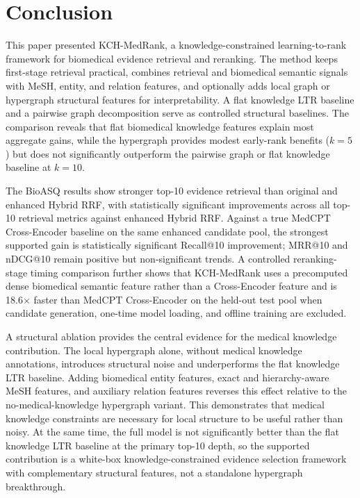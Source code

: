 \section{Conclusion}

This paper presented KCH-MedRank, a knowledge-constrained learning-to-rank framework for biomedical evidence retrieval and reranking. The method keeps first-stage retrieval practical, combines retrieval and biomedical semantic signals with MeSH, entity, and relation features, and optionally adds local graph or hypergraph structural features for interpretability. A flat knowledge LTR baseline and a pairwise graph decomposition serve as controlled structural baselines. The comparison reveals that flat biomedical knowledge features explain most aggregate gains, while the hypergraph provides modest early-rank benefits ($k{=}5$) but does not significantly outperform the pairwise graph or flat knowledge baseline at $k{=}10$.

The BioASQ results show stronger top-10 evidence retrieval than original and enhanced Hybrid RRF, with statistically significant improvements across all top-10 retrieval metrics against enhanced Hybrid RRF. Against a true MedCPT Cross-Encoder baseline on the same enhanced candidate pool, the strongest supported gain is statistically significant Recall@10 improvement; MRR@10 and nDCG@10 remain positive but non-significant trends. A controlled reranking-stage timing comparison further shows that KCH-MedRank uses a precomputed dense biomedical semantic feature rather than a Cross-Encoder feature and is 18.6$\times$ faster than MedCPT Cross-Encoder on the held-out test pool when candidate generation, one-time model loading, and offline training are excluded.

A structural ablation provides the central evidence for the medical knowledge contribution. The local hypergraph alone, without medical knowledge annotations, introduces structural noise and underperforms the flat knowledge LTR baseline. Adding biomedical entity features, exact and hierarchy-aware MeSH features, and auxiliary relation features reverses this effect relative to the no-medical-knowledge hypergraph variant. This demonstrates that medical knowledge constraints are necessary for local structure to be useful rather than noisy. At the same time, the full model is not significantly better than the flat knowledge LTR baseline at the primary top-10 depth, so the supported contribution is a white-box knowledge-constrained evidence selection framework with complementary structural features, not a standalone hypergraph breakthrough.

